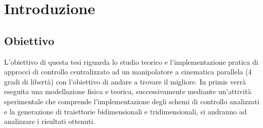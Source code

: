 \section{Introduzione}

\subsection{Obiettivo}
L'obiettivo di questa tesi riguarda lo studio teorico e l'implementazione pratica di approcci di controllo centralizzato ad un manipolatore a cinematica parallela (4 gradi di libertà) con l'obiettivo di andare a trovare il migliore. In primis verrà eseguita una modellazione fisica e teorica, successivamente mediante un'attività sperimentale che comprende l'implementazione degli schemi di controllo analizzati e la generazione di traiettorie bidimensionali e tridimensionali, si andranno ad analizzare i risultati ottenuti.
